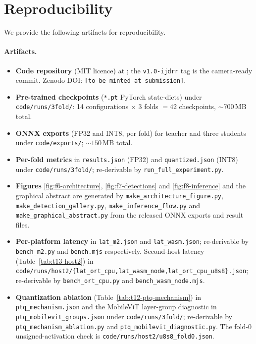 
\section{Reproducibility}
\label{sec:appendix-repro}

\footnotesize
\sloppy
\setlength{\emergencystretch}{3em}

We provide the following artifacts for reproducibility.

\paragraph{Artifacts.}
\begin{itemize}\setlength\itemsep{2pt}
\item \textbf{Code repository} (MIT licence) at \repoURL; the \texttt{v1.0-ijdrr} tag is the camera-ready commit. Zenodo DOI: \texttt{[to be minted at submission]}.
\item \textbf{Pre-trained checkpoints} (\texttt{*.pt} PyTorch state-dicts) under \texttt{code/runs/3fold/}: 14 configurations $\times$ 3 folds $= 42$ checkpoints, $\sim 700$\,MB total.
\item \textbf{ONNX exports} (FP32 and INT8, per fold) for teacher and three students under \texttt{code/exports/}; $\sim 150$\,MB total.
\item \textbf{Per-fold metrics} in \texttt{results.json} (FP32) and \texttt{quantized.json} (INT8) under \texttt{code/runs/3fold/}; re-derivable by \texttt{run\_full\_experiment.py}.
\item \textbf{Figures} \ref{fig:f6-architecture}, \ref{fig:f7-detections} and \ref{fig:f8-inference} and the graphical abstract are generated by \texttt{make\_architecture\_figure.py}, \texttt{make\_detection\_gallery.py}, \texttt{make\_inference\_flow.py} and \texttt{make\_graphical\_abstract.py} from the released ONNX exports and result files.
\item \textbf{Per-platform latency} in \texttt{lat\_m2.json} and \texttt{lat\_wasm.json}; re-derivable by \texttt{bench\_m2.py} and \texttt{bench.mjs} respectively. Second-host latency (Table~\ref{tab:t13-host2}) in \texttt{code/runs/host2/\{lat\_ort\_cpu,lat\_wasm\_node,lat\_ort\_cpu\_u8s8\}.json}; re-derivable by \texttt{bench\_ort\_cpu.py} and \texttt{bench\_wasm\_node.mjs}.
\item \textbf{Quantization ablation} (Table~\ref{tab:t12-ptq-mechanism}) in \texttt{ptq\_mechanism.json} and the MobileViT layer-group diagnostic in \texttt{ptq\_mobilevit\_groups.json} under \texttt{code/runs/3fold/}; re-derivable by \texttt{ptq\_mechanism\_ablation.py} and \texttt{ptq\_mobilevit\_diagnostic.py}. The fold-0 unsigned-activation check is \texttt{code/runs/host2/u8s8\_fold0.json}.

\end{itemize}
